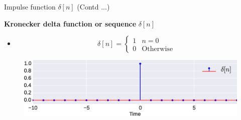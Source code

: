 \documentclass[aspectratio=169]{beamer}
\let\olditem\item
\renewcommand{\item}{\setlength{\itemsep}{\fill}\olditem}
\begin{document}







\begin{frame}[t]
\end{frame}


\begin{frame}{Impulse function $\delta[n]$ (Contd ...)}

\textbf{Kronecker delta function or sequence} $\delta[n]$

\begin{itemize}
\item \[ \delta[n] = \begin{cases}
1 & n = 0 \\
0 & \mathrm{Otherwise}
\end{cases} \]
\end{itemize}

\begin{figure}
\includegraphics[width=\textwidth]{img/disc_imp.eps}
\end{figure}
\end{frame}
\end{document}
